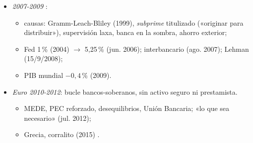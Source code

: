 \documentclass{article}
\begin{document}
\begin{columnas}
\begin{itemize}
\item \emph{2007-2009} :
  \begin{itemize}
  \item causas: Gramm-Leach-Bliley (1999), \emph{subprime} titulizado («originar para distribuir»), supervisión laxa, banca en la sombra, ahorro exterior;
  \item Fed 1\,\% (2004) $\to$ 5,25\,\% (jun. 2006); interbancario (ago. 2007); Lehman (15/9/2008);
  \item PIB mundial $-0{,}4$\,\% (2009).
  \end{itemize}
\item \emph{Euro 2010-2012}: bucle bancos-soberanos, sin activo seguro ni prestamista.
  \begin{itemize}
  \item MEDE, PEC reforzado, desequilibrios, Unión Bancaria; «lo que sea necesario» (jul. 2012);
  \item Grecia, corralito (2015) .
  \end{itemize}
\end{itemize}


\end{columnas}
\end{document}
